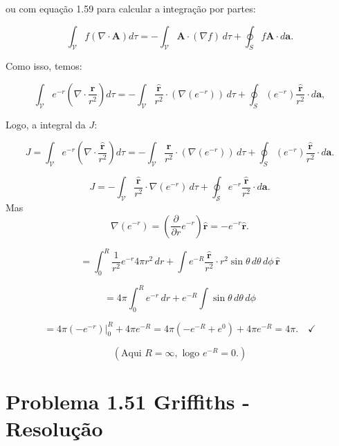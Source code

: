 \documentclass[a4paper,12pt]{article}
\begin{document}
ou com equação 1.59 para calcular a integra\c{c}\~ao por partes:

\begin{equation}
\int_{\mathcal{V}} f \left( \nabla \cdot \mathbf{A} \right) d\tau = -\int_{\mathcal{V}}\mathbf{A} \cdot (\nabla f)\, d\tau + \oint_S f \mathbf{A} \cdot d\mathbf{a}.
\end{equation}

Como isso, temos:

\begin{equation}
    \int_{\mathcal{V}} e^{-r} \left( \nabla \cdot \frac{\hat{\mathbf{r}}}{r^2} \right) d\tau = -\int_{\mathcal{V}}\frac{\hat{\mathbf{r}}}{r^2} \cdot (\nabla (e^{-r}))\, d\tau + \oint_S (e^{-r}) \frac{\hat{\mathbf{r}}}{r^2} \cdot d\mathbf{a},
\end{equation}

Logo, a integral da $J$:

\begin{equation}
    J = \int_{\mathcal{V}} e^{-r} \left( \nabla \cdot \frac{\hat{\mathbf{r}}}{r^2} \right) d\tau = -\int_{\mathcal{V}}\frac{\hat{\mathbf{r}}}{r^2} \cdot (\nabla (e^{-r}))\, d\tau + \oint_S (e^{-r}) \frac{\hat{\mathbf{r}}}{r^2} \cdot d\mathbf{a}.
\end{equation}

\[
J = -\int_{\mathcal{V}} \frac{\hat{\mathbf{r}}}{r^2} \cdot \nabla (e^{-r}) \, d\tau + \oint_{\mathcal{S}} e^{-r} \frac{\hat{\mathbf{r}}}{r^2} \cdot d\mathbf{a}.
\]
Mas 
\[
\nabla (e^{-r}) = \left( \frac{\partial}{\partial r} e^{-r} \right) \hat{\mathbf{r}} = -e^{-r} \hat{\mathbf{r}}.
\]

\[
= \int_0^R \frac{1}{r^2} e^{-r} 4\pi r^2 \, dr + \int e^{-R} \frac{\hat{\mathbf{r}}}{r^2} \cdot r^2 \sin\theta \, d\theta \, d\phi \, \hat{\mathbf{r}}
\]

\[
= 4\pi \int_0^R e^{-r} \, dr + e^{-R} \int \sin\theta \, d\theta \, d\phi
\]

\[
= 4\pi \left( -e^{-r} \right) \Big|_0^R + 4\pi e^{-R} = 4\pi (-e^{-R} + e^{0}) + 4\pi e^{-R} = 4\pi. \quad \checkmark
\]

\[
(\text{Aqui } R = \infty, \text{ logo } e^{-R} = 0.)
\]


\section*{Problema 1.51 Griffiths - Resolu\c{c}\~ao}
\end{document}
